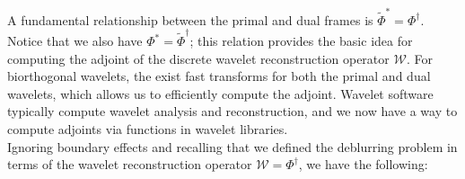 \documentclass[journal]{IEEEtran}
\begin{document}
%
%
%
%
%
%
%

   \noindent A fundamental relationship between the primal and dual frames is $\tilde{\Phi}^\ast = \Phi^\dagger$.  Notice that we also have $\Phi^\ast = \tilde{\Phi}^\dagger$; this relation provides the basic idea for computing the adjoint of the discrete wavelet reconstruction operator $\mathcal{W}$.  For biorthogonal wavelets, the exist fast transforms for both the primal and dual wavelets, which allows us to efficiently compute the adjoint.  Wavelet software typically compute wavelet analysis and reconstruction, and we now have a way to compute adjoints via functions in wavelet libraries.\\
   
   Ignoring boundary effects and recalling that we defined the deblurring problem in terms of the wavelet reconstruction operator $\mathcal{W}=\Phi^\dagger$, we have the following:
\end{document}
